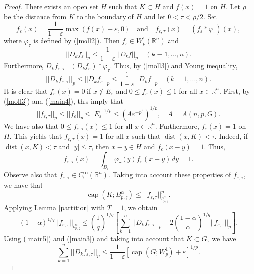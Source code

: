 \documentclass[12pt,twoside,reqno]{amsart}
\numberwithin{equation}{section}
\theoremstyle{definition}
\numberwithin{equation}{section}
\begin{document}
\begin{proof}
There exists an open set  $H$  such that $K\subset H$ and $f(x)=1$
on $H$. Let $\rho$ be the distance from $K$ to the boundary of $H$
and let $0<\tau<\rho/2.$ Set
$$
f_{\varepsilon}(x)=\frac1{1-{\varepsilon}}\max(f(x)-{\varepsilon}, 0)\quad\mbox{and}\quad f_{{\varepsilon},\tau}(x)= (f_{\varepsilon}\ast {\varphi}_\tau)(x),
$$
where ${\varphi}_\tau$ is defined by (\ref{moll2}). Then $f_{\varepsilon}\in
W_p^1({\mathbb{R}}^n)$ and
$$
||D_k f_{\varepsilon}||_p\le \frac1{1-{\varepsilon}}||D_k f||_p \quad (k=1,...,n).
$$
 Furthermore, $D_k f_{{\varepsilon},\tau}$=$(D_k f_{\varepsilon})\ast{\varphi}_\tau.$ Thus, by (\ref{moll3}) and Young inequality,
\begin{equation}\label{main5}
||D_k f_{{\varepsilon},\tau}||_p\le ||D_k f_{\varepsilon}||_p\le \frac1{1-{\varepsilon}}||D_k f||_p \quad (k=1,...,n).
\end{equation}
It is clear that $f_{\varepsilon}(x)=0$ if $x\not\in E_{\varepsilon}$ and $0\le f_{\varepsilon}(x)\le 1$ for all $x\in {\mathbb{R}}^n.$ First, by
 (\ref{moll3}) and (\ref{main4}), this imply that
\begin{equation}\label{main7}
||f_{{\varepsilon},\tau}||_p\le||f_{\varepsilon}||_p\le |E_{\varepsilon}|^{1/p} \le (A{\varepsilon}^{-p^*})^{1/p},\quad A=A(n,p,G).
\end{equation}
We have also that $0\le f_{{\varepsilon},\tau}(x)\le 1$ for all $x\in {\mathbb{R}}^n.$ Furthermore, $f_{\varepsilon}(x)=1$
on $H.$ This yields that
$f_{{\varepsilon},\tau}(x)=1$ for all $x$ such that ${\operatorname{dist}}(x,K)<\tau.$
Indeed, if ${\operatorname{dist}}(x,K)<\tau$ and $|y|\le \tau$, then $x-y\in H$ and $f_{\varepsilon}(x-y)=1.$
Thus,
$$
f_{{\varepsilon},\tau}(x)=\int_{B_\tau}{\varphi}_\tau(y) f_{\varepsilon}(x-y)\,dy=1.
$$
Observe also that
$f_{{\varepsilon},\tau}\in C_0^\infty({\mathbb{R}}^n).$ Taking into account these properties of $f_{{\varepsilon},\tau}$, we have that
\begin{equation}\label{main6}
{\operatorname{cap}}\left(K;B_{p,q}^{\alpha}\right)\le ||f_{{\varepsilon},\tau}||_{b_{p,q}^{\alpha}}^p.
\end{equation}
Applying Lemma \ref{partition} with $T=1$, we obtain
$$
(1-{\alpha})^{1/q}||f_{{\varepsilon},\tau}||_{b_{p,q}^{\alpha}} \le  \left(\frac1q\right)^{1/q}\left[\sum_{k=1}^n ||D_k f_{{\varepsilon},\tau}||_p+2\left(\frac{1-{\alpha}}{\alpha}\right)^{1/q}||f_{{\varepsilon},\tau}||_p\right].
$$
Using  (\ref{main5}) and (\ref{main3}) and taking into account that
$K\subset G,$ we have
$$
\sum_{k=1}^n||D_k f_{{\varepsilon},\tau}||_p\le \frac1{1-{\varepsilon}}\left[{\operatorname{cap}} (G;W_p^1)+{\varepsilon}\right]^{1/p}.
$$
\end{proof}
\end{document}
